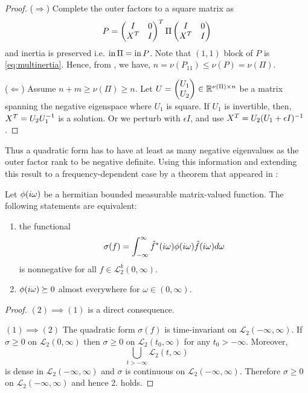 \begin{proof} ($\Rightarrow$) Complete the outer factors to a square matrix as
\[
P = \begin{pmatrix}I &0\\X^T &I\end{pmatrix}^T\Pi\begin{pmatrix}I &0\\X^T &I\end{pmatrix}
\]
and inertia is preserved i.e. $\operatorname{in} \Pi = \operatorname{in} P$. Note that $(1,1)$ block of $P$ is \eqref{eq:multinertia}. 
Hence, from , we have, $n = \nu(P_{11})\leq \nu({P}) = \nu(\Pi)$.


($\Leftarrow$) Assume $n+m \geq \nu(\Pi)\geq n$. Let $U = \begin{pmatrix}U_1\\U_2\end{pmatrix} \in\mathbb{R}^{\nu(\Pi)\times n}$ be a 
matrix spanning the negative eigenspace where $U_1$ is square. If $U_1$ is invertible, then, $X^T = U_2U_1^{-1}$ 
is a solution. Or we perturb with $\epsilon I$, and use $X^T= U_2(U_1+\epsilon I)^{-1}$. 
\end{proof}
Thus a quadratic form has to have at least as many negative eigenvalues as the outer factor rank to be negative definite. 
Using this information and extending this result to a frequency-dependent case by a theorem that appeared in 
\cite{megretskitreil}:

\begin{thm}\label{thm:megretskitreil} Let $\phi(i\omega)$ be a hermitian bounded measurable matrix-valued function. The following statements are equivalent:
\begin{enumerate}
	\item the functional 
	\[
	\sigma(f) = \int_{-\infty}^\infty{\hat{f}^*(i\omega)\phi(i\omega)\hat{f}(i\omega)d\omega}
	\]
	is nonnegative for all $f\in\mathcal{L}_2^k(0,\infty)$. 
	\item $\phi(i\omega)\succeq 0$ almost everywhere for $\omega\in(0,\infty)$.
\end{enumerate}
\end{thm}
\begin{proof}\parbox{0pt}{}\par

$(2)\implies (1)$ is a direct consequence.


$(1)\implies (2)$ The quadratic form $\sigma(f)$ is time-invariant on $\mathcal{L}_2(-\infty,\infty)$. If 
	$\sigma\geq 0$ on $\mathcal{L}_2(0,\infty)$ then $\sigma\geq 0$ on $\mathcal{L}_2(t_0,\infty)$ for any $t_0>-\infty$.
	Moreover, 
	\[
	\bigcup\limits_{t>-\infty}\mathcal{L}_2(t,\infty)
	\]
	is dense in $\mathcal{L}_2(-\infty,\infty)$ and $\sigma$ is continuous on $\mathcal{L}_2(-\infty,\infty)$. Therefore
	$\sigma\geq 0$ on $\mathcal{L}_2(-\infty,\infty)$ and hence 2. holds.
\end{proof}

